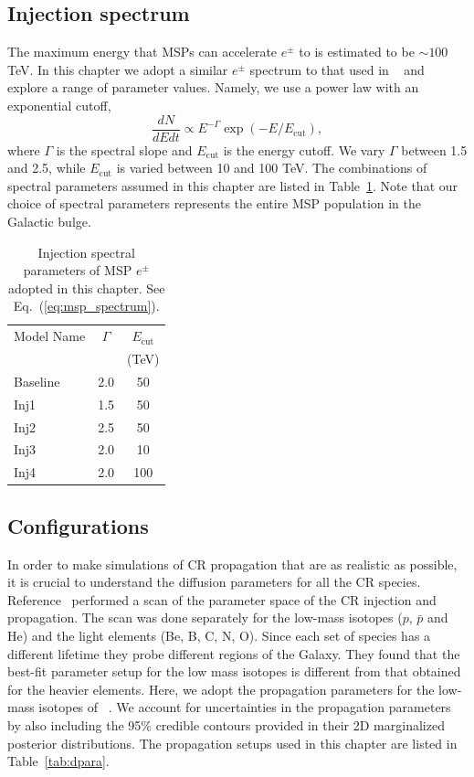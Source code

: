 \documentclass[doublespace,nopageskip]{VTthesis} %
\begin{document}
\subsection{Injection spectrum}\label{sec:spectrum}

The maximum energy that MSPs can accelerate $e^{\pm}$ to is estimated to be $\sim 100$ TeV. In this chapter we adopt a similar $e^\pm$ spectrum to that used in ~\citet{2015ApJ...802..124Y} and explore a range of parameter values. Namely, we use a power law with an exponential cutoff,
\begin{equation}
  \label{eq:msp_spectrum}
  \dfrac{dN}{dEdt} \propto E^{-\Gamma}\exp(-E/E_{\text{cut}}),
\end{equation}
where $\Gamma$ is the spectral slope and $E_{\text{cut}}$ is the energy cutoff. We vary $\Gamma$ between 1.5 and 2.5, while $E_{\text{cut}}$ is varied between 10 and 100 TeV. The combinations of spectral parameters assumed in this chapter are listed in Table~\ref{tab:msp_spectrum}. Note that our choice of spectral parameters represents the entire MSP population in the Galactic bulge.
\begin{table}[htb]
  \centering
  \caption{Injection spectral parameters of MSP $e^{\pm}$ adopted in this chapter. See Eq.~(\ref{eq:msp_spectrum}).}
    \begin{tabular}{lcc}
    \toprule
    Model Name&$\Gamma$ & $E_{\text{cut}}$\\
    & &  (TeV) \\
    \midrule
    Baseline &2.0 & 50 \\
    Inj1&1.5 & 50 \\
    Inj2&2.5 & 50 \\
    Inj3&2.0 & 10 \\
    Inj4&2.0 & 100\\
    \bottomrule
    \end{tabular}
  \label{tab:msp_spectrum}
\end{table}

\subsection{Configurations}

In order to make simulations of CR propagation that are as realistic as possible, it is crucial to understand the diffusion parameters for all the CR species. Reference~\cite{2016ApJ...824...16J} performed a scan of the parameter space of the CR injection and propagation. The scan was done separately for the low-mass isotopes ($p$, $\bar{p}$ and He) and the light elements (Be, B, C, N, O). Since each set of species has a different lifetime they probe different regions of the Galaxy. They found that the best-fit parameter setup for the low mass isotopes is different from that obtained for the heavier elements. Here, we adopt the propagation parameters for the low-mass isotopes of ~\citet{2016ApJ...824...16J}. We account for uncertainties in the propagation parameters by also including the 95\% credible contours provided in their 2D marginalized posterior distributions. The propagation setups used in this chapter are listed in Table~\ref{tab:dpara}.
\end{document}
